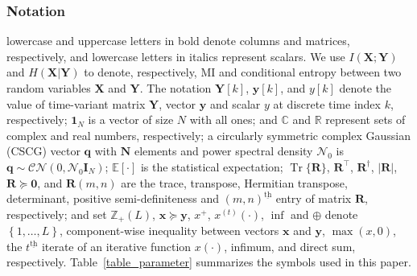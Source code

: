 \documentclass[10pt,journal]{IEEEtran}
\DeclareMathOperator{\trace}{Tr}
\newcommand{\paren}[1]{\left({#1}\right)}
\newcommand{\bracket}[1]{{\left [{#1}\right ]}}
\newcommand{\ith}[1]    {{#1}^{\underline{\text{th}}}}
\theoremstyle{definition}
\begin{document}
\subsubsection*{Notation} lowercase and uppercase letters in bold denote columns and matrices, respectively, and lowercase letters in italics represent scalars. We use $I(\mathbf{X};\mathbf{Y})$ and $H\paren{\mathbf{X}|\mathbf{Y}}$ to denote, respectively, MI and conditional entropy between two random variables $\mathbf{X}$ and $\mathbf{Y}$. The notation $\mathbf{Y}\bracket{k}$, $\mathbf{y}\bracket{k}$, and $y\bracket{k}$ denote the value of time-variant matrix $\mathbf{Y}$, vector $\mathbf{y}$ and scalar $y$ at discrete time index $k$, respectively; $\mathbf{1}_{\mathit{N}}$ is a vector of size $\mathit{N}$ with all ones; and $\mathbb{C}$ and $\mathbb{R}$ represent sets of complex and real numbers, respectively; a circularly symmetric complex Gaussian (CSCG) vector $\mathbf{q}$ with $\mathbf{N}$ elements and power spectral density $\mathcal{N}_0$ is $\mathbf{q}\sim\mathcal{CN}(0,\mathcal{N}_0\mathbf{I}_{\mathit{N}})$; $\mathbb{E}\bracket{\cdot}$ is the statistical expectation; $\trace\{\mathbf{R}\}$, $\mathbf{R}^\top$, $\mathbf{R}^\dagger$, $\left| \mathbf{R}\right|$, $\mathbf{R}\succeq\mathbf{0}$, and $\mathbf{R}\paren{m,n}$ are the trace, transpose, Hermitian transpose, determinant, positive semi-definiteness and $\ith{\paren{m,n}}$ entry of matrix $\mathbf{R}$, respectively; and set $\mathbb{Z}_{+}(L)$, $\mathbf{x}\succeq\mathbf{y}$, $x^+$, $x^{\paren{t}}\paren{\cdot}$, $\inf$ and $\oplus$ denote $\left\lbrace1,\dots,L\right\rbrace$,  component-wise inequality between vectors $\mathbf{x}$ and $\mathbf{y}$, $\max(x,0)$, the $\ith{t}$ iterate of an iterative function $x\paren{\cdot}$, infimum, and direct sum, respectively. 
\color{red} Table~\ref{table_parameter} summarizes the symbols used in this paper.
\end{document}
